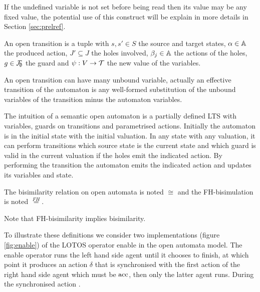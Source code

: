 \documentclass{article}
\begin{document}
If the undefined variable is not set before being read then its value may be any fixed value, the potential use of this construct will be explain in more details in Section \ref{sec:prelref}.
\begin{defi}
An open transition is a tuple \nmm{\OTg} with \(s, s' \in S\) the source and target states, \(\alpha \in {\mathbb{A}}\) the produced action, \(J' \subseteq J\) the holes involved, \(\beta_j \in {\mathbb{A}}\) the actions of the holes, \(g \in {\mathcal{F}}_{\!\!\emptyset}\) the guard and \(\psi: V \to {\mathcal{T}}\) the new value of the variables.
\end{defi}
An open transition can have many unbound variable, actually an effective transition of the automaton is any well-formed substitution of the unbound variables of the transition minus the automaton variables.

The intuition of a semantic open automaton is a partially defined LTS with variables, guards on transitions and parametrised actions.
Initially the automaton is in the initial state with the initial valuation.
In any state with any valuation, it can perform transitions which source state is the current state and which guard is valid in the current valuation if the holes emit the indicated action.
By performing the transition the automaton emits the indicated action and updates its variables and state.

\begin{noti}
The bisimilarity relation on open automata is noted \(\cong\) and the FH-bisimulation \cite{henrio:01055091} is noted \(\overset{FH}=\).
\end{noti}
Note that FH-bisimilarity implies bisimilarity.

To illustrate these definitions we consider  two implementations (figure \ref{fig:enable}) of the LOTOS \cite{ISOLOTOS} operator enable in the open automata model.
The enable operator runs  the left hand side agent until it chooses to finish, at which point it produces an action \(\delta\) that is synchronised with the first action of the right hand side agent which must be \(\mathrm{acc}\), then only the latter agent runs.
During the synchronised action .
\end{document}
